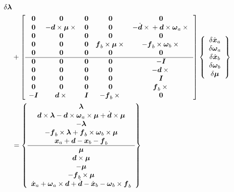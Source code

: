 \documentclass[10pt,dvips,fleqn,subeqn]{report}
\newcommand{\T}[1]{\boldsymbol{#1}}
\begin{document}
\begin{align}
{{		\delta\T{\lambda}
	}} \nonumber \\
	&+ \sqbr{\matr{ccccc}{
		\T{0} & \T{0} & \T{0} & \T{0} & \T{0} \\ 	%
		\T{0} & -\T{d}\times\T{\mu}\times{} &
			\T{0} & \T{0} & 
			- \dot{\T{d}}\times{}
			+ \T{d}\times\T{\omega}_a\times{} \\	%
		\T{0} & \T{0} & \T{0} & \T{0} & \T{0} \\	%
		\T{0} & \T{0} & \T{0} & \T{f}_b\times\T{\mu}\times{} &
			-\T{f}_b\times\T{\omega}_b\times{} \\	%
		\T{0} & \T{0} & \T{0} & \T{0} & \T{0} \\	%
%
	\hline
		\T{0} & \T{0} & \T{0} & \T{0} & -\T{I} \\	%
		\T{0} & \T{0} &
			\T{0} & \T{0} & -\T{d}\times{} \\	%
		\T{0} & \T{0} & \T{0} & \T{0} & \T{I} \\	%
		\T{0} & \T{0} & \T{0} & \T{0} &
			\T{f}_b\times{} \\	%
		-\T{I} & \T{d}\times{} & \T{I} & -\T{f}_b\times{} &
			\T{0} 					%
	}} \cubr{\cvvect{
		\delta\dot{\T{x}}_a \\
		\delta\T{\omega}_a \\
		\delta\dot{\T{x}}_b \\
		\delta\T{\omega}_b \\
		\delta\T{\mu}
	}} \nonumber \\
	&= \cubr{\cvvect{
		\T{\lambda} \\
		\T{d}\times\T{\lambda}
			- \T{d}\times\T{\omega}_a\times\T{\mu}
			+ \dot{\T{d}}\times\T{\mu} \\
		-\T{\lambda} \\
		-\T{f}_b\times\T{\lambda}
			+ \T{f}_b\times\T{\omega}_b\times\T{\mu} \\
		\T{x}_a + \T{d} - \T{x}_b - \T{f}_b \\
%
		\hline
		\T{\mu} \\
		\T{d}\times\T{\mu} \\
		-\T{\mu} \\
		-\T{f}_b\times\T{\mu} \\
		\dot{\T{x}}_a + \T{\omega}_a\times\T{d} + \dot{\T{d}}
			- \dot{\T{x}}_b - \T{\omega}_b\times\T{f}_b
	}}
\end{align}
\end{document}
